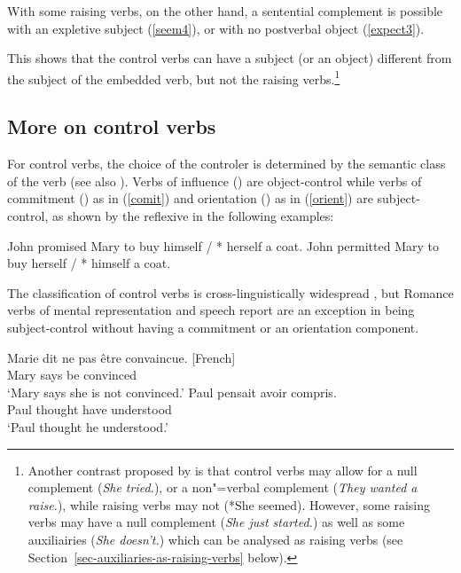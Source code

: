 \documentclass[output=paper
	        ,collection
	        ,collectionchapter
 	        ,biblatex
                ,babelshorthands
                ,newtxmath
                ,draftmode
                ,colorlinks, citecolor=brown
]{langscibook}
\begin{document}
With some raising verbs, on the other hand, a sentential complement is possible with an expletive subject (\ref{seem4}), or with no postverbal object (\ref{expect3}).

\eal
{}
\zl

This shows that the control verbs can have a subject (or an object) different from the subject of the embedded verb, but not the raising verbs.\footnote{Another contrast proposed by \citet{Jacobson1990} is that control verbs may allow for a null complement (\emph{She tried.}), or a non"=verbal complement (\emph{They wanted a raise.}), while raising verbs may not (*She seemed). However, some raising verbs may have a null complement (\emph{She just started.}) as well as some auxiliairies (\emph{She doesn't.}) which can be analysed as raising verbs (see Section~\ref{sec-auxiliaries-as-raising-verbs} below).}

\subsection{More on control verbs}

For control verbs, the choice of the controler is determined by the semantic class of the verb \citet{PollardandSag1992} (see also \citealt{JackendoffandCulicover2003}).  Verbs of influence () are object-control
while verbs of commitment () as in (\ref{comit}) and orientation () as in (\ref{orient}) are subject-control, as shown by the reflexive in the following examples:

\begin{exe}
	\ex \begin{xlist}
	\ex John promised Mary to buy himself / * herself a coat. \label{comit}
   \ex 	John permitted Mary to buy herself / * himself a coat.\label{orient}
 \end{xlist}
 \end{exe}
 
  The classification of control verbs is cross-linguistically widespread \citep{VanValinandLapolla1997}, but Romance verbs of mental representation and speech report are an exception in being subject-control without having a commitment or an orientation component.


\begin{exe}
\ex \begin{xlist}
\ex \gll Marie dit {ne pas} \^etre convaincue. [French] \\
Mary says  be convinced \\
\glt `Mary says she is not convinced.'	
\ex \gll Paul pensait  avoir compris. \\
Paul thought have understood \\
\glt `Paul thought he understood.'
 \end{xlist}
\end{exe}
\end{document}
